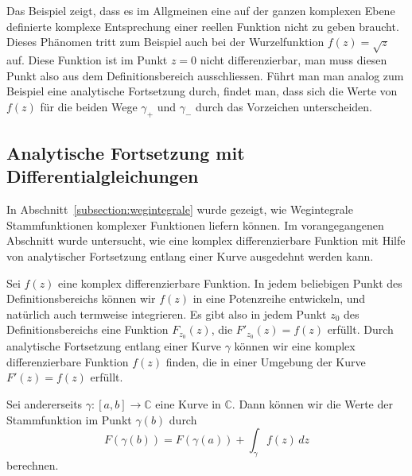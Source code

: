 Das Beispiel zeigt, dass es im Allgmeinen eine auf der ganzen komplexen
Ebene definierte komplexe Entsprechung einer reellen Funktion nicht
zu geben braucht.
Dieses Phänomen tritt zum Beispiel auch bei der Wurzelfunktion $f(z)=\sqrt{z}$
auf.
Diese Funktion ist im Punkt $z=0$ nicht differenzierbar, man muss diesen
Punkt also aus dem Definitionsbereich ausschliessen.
Führt man man analog zum Beispiel eine analytische Fortsetzung durch,
findet man, dass sich die Werte von $f(z)$ für die beiden Wege $\gamma_+$
und $\gamma_-$ durch das Vorzeichen unterscheiden.
\subsection{Analytische Fortsetzung mit Differentialgleichungen
\label{komplex:analytische-fortsetzung-dgl}}
In Abschnitt~\ref{subsection:wegintegrale} wurde gezeigt, wie Wegintegrale
Stammfunktionen komplexer Funktionen liefern können.
Im vorangegangenen Abschnitt wurde untersucht, wie eine komplex differenzierbare
Funktion mit Hilfe von analytischer Fortsetzung entlang einer Kurve
ausgedehnt werden kann.

Sei $f(z)$ eine komplex differenzierbare Funktion.
In jedem beliebigen Punkt des Definitionsbereichs können wir $f(z)$
in eine Potenzreihe entwickeln, und natürlich auch termweise integrieren.
Es gibt also in jedem Punkt $z_0$ des Definitionsbereichs eine
Funktion $F_{z_0}(z)$, die $F'_{z_0}(z)=f(z)$ erfüllt.
Durch analytische Fortsetzung entlang einer Kurve $\gamma$ können
wir eine komplex differenzierbare Funktion $f(z)$ finden, die in einer
Umgebung der Kurve $F'(z)=f(z)$ erfüllt.

Sei andererseits $\gamma\colon[a,b]\to\mathbb C$ eine Kurve in $\mathbb C$.
Dann können wir die Werte der Stammfunktion im Punkt $\gamma(b)$ durch
\[
F(\gamma(b)) = F(\gamma(a))+\int_\gamma f(z)\,dz
\]
berechnen.

